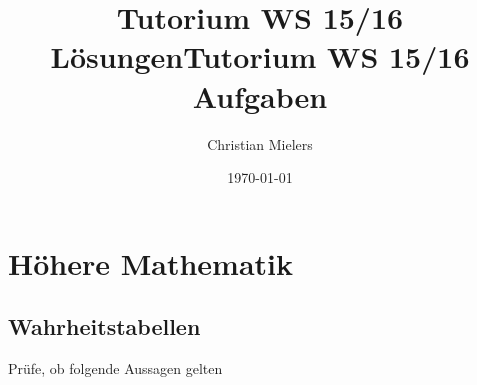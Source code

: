 \documentclass[11pt, a4paper]{article}
\title{Tutorium WS 15/16 \\ Lösungen}
\title{Tutorium WS 15/16 \\ Aufgaben}
\author{Christian Mielers}
\date{\today}
\begin{document}
\maketitle
\tableofcontents

\newpage
\section{Höhere Mathematik}
\subsection{Wahrheitstabellen}
Prüfe, ob folgende Aussagen gelten
\end{document}
